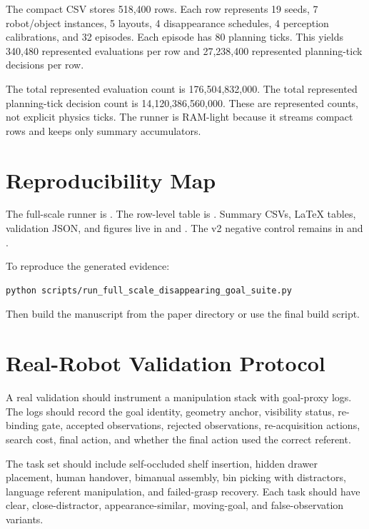 The compact CSV stores 518,400 rows. Each row represents 19 seeds, 7 robot/object instances, 5 layouts, 4 disappearance schedules, 4 perception calibrations, and 32 episodes. Each episode has 80 planning ticks. This yields 340,480 represented evaluations per row and 27,238,400 represented planning-tick decisions per row.

The total represented evaluation count is 176,504,832,000. The total represented planning-tick decision count is 14,120,386,560,000. These are represented counts, not explicit physics ticks. The runner is RAM-light because it streams compact rows and keeps only summary accumulators.

\section{Reproducibility Map}

The full-scale runner is . The row-level table is . Summary CSVs, LaTeX tables, validation JSON, and figures live in  and . The v2 negative control remains in  and .

To reproduce the generated evidence:
\begin{verbatim}
python scripts/run_full_scale_disappearing_goal_suite.py
\end{verbatim}
Then build the manuscript from the paper directory or use the final build script.

\section{Real-Robot Validation Protocol}

A real validation should instrument a manipulation stack with goal-proxy logs. The logs should record the goal identity, geometry anchor, visibility status, re-binding gate, accepted observations, rejected observations, re-acquisition actions, search cost, final action, and whether the final action used the correct referent.

The task set should include self-occluded shelf insertion, hidden drawer placement, human handover, bimanual assembly, bin picking with distractors, language referent manipulation, and failed-grasp recovery. Each task should have clear, close-distractor, appearance-similar, moving-goal, and false-observation variants.

